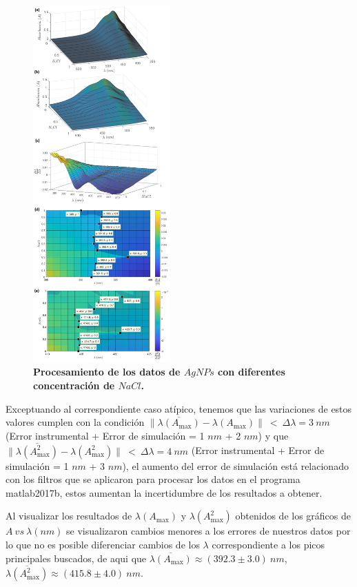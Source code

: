\begin{figure}
    \includegraphics[width=0.47\textwidth]{Tarea3/AgNPs_NaCl.png}
    \caption{\textbf{Procesamiento de los datos de $AgNPs$ con diferentes concentración de $NaCl$.}}
    \label{nacl}
\end{figure}

Exceptuando al correspondiente caso atípico, tenemos que las variaciones de estos valores cumplen con la condición $ \|\overline{ \lambda (A_{\max}) }  - \lambda ( A_{\max})\|~ < ~\Delta\lambda=3 ~nm$  (Error instrumental + Error de simulación = 1 $nm$ + 2 $nm$) y que $ \|\overline{ \lambda (A_{\max}^2) }  - \lambda ( A_{\max}^2)\|~ < ~\Delta\lambda=4 ~nm$  (Error instrumental + Error de simulación = 1 $nm$ + 3 $nm$), el aumento del error de simulación está relacionado con los filtros que se aplicaron para procesar los datos en el programa matlab2017b, estos aumentan la incertidumbre de los resultados a obtener.

Al visualizar los resultados de $\lambda (A_{\max})$ y $\lambda (A_{\max}^2)$ obtenidos de los gráficos de $A~vs~\lambda (nm)$ se visualizaron cambios menores a los errores de nuestros datos por lo que no es posible diferenciar cambios de los $\lambda$ correspondiente a los picos principales buscados, de aqui que $\overline{ \lambda ( A_{\max} )} \approx (392.3\pm 3.0)~nm$, $\overline{ \lambda ( A_{\max}^2 )} \approx (415.8\pm 4.0)~nm$.

